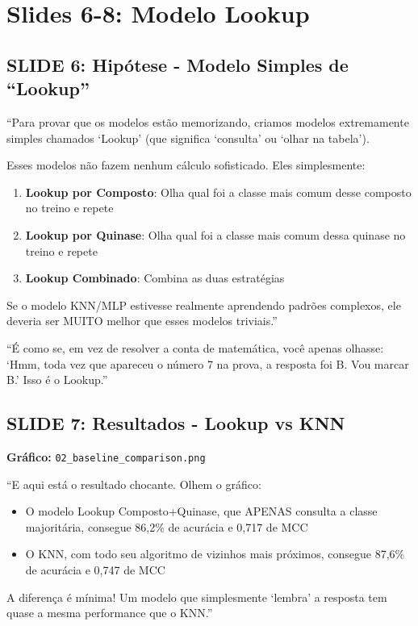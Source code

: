 \documentclass[11pt,a4paper]{article}
\begin{document}
\section{Slides 6-8: Modelo Lookup}

\subsection{SLIDE 6: Hipótese - Modelo Simples de ``Lookup''}

\begin{oquedizer}
``Para provar que os modelos estão memorizando, criamos modelos extremamente simples chamados `Lookup' (que significa `consulta' ou `olhar na tabela').

Esses modelos não fazem nenhum cálculo sofisticado. Eles simplesmente:
\begin{enumerate}
    \item \textbf{Lookup por Composto}: Olha qual foi a classe mais comum desse composto no treino e repete
    \item \textbf{Lookup por Quinase}: Olha qual foi a classe mais comum dessa quinase no treino e repete
    \item \textbf{Lookup Combinado}: Combina as duas estratégias
\end{enumerate}

Se o modelo KNN/MLP estivesse realmente aprendendo padrões complexos, ele deveria ser MUITO melhor que esses modelos triviais.''
\end{oquedizer}

\begin{analogia}
``É como se, em vez de resolver a conta de matemática, você apenas olhasse: `Hmm, toda vez que apareceu o número 7 na prova, a resposta foi B. Vou marcar B.' Isso é o Lookup.''
\end{analogia}

\subsection{SLIDE 7: Resultados - Lookup vs KNN}

\textbf{Gráfico:} \texttt{02\_baseline\_comparison.png}

\begin{oquedizer}
``E aqui está o resultado chocante. Olhem o gráfico:
\begin{itemize}
    \item O modelo Lookup Composto+Quinase, que APENAS consulta a classe majoritária, consegue 86,2\% de acurácia e 0,717 de MCC
    \item O KNN, com todo seu algoritmo de vizinhos mais próximos, consegue 87,6\% de acurácia e 0,747 de MCC
\end{itemize}

A diferença é mínima! Um modelo que simplesmente `lembra' a resposta tem quase a mesma performance que o KNN.''
\end{oquedizer}
\end{document}
